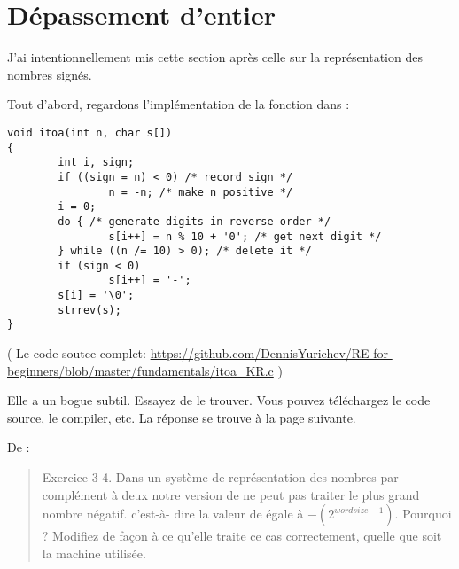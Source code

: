 \section{Dépassement d'entier}

J'ai intentionnellement mis cette section après celle sur la représentation des nombres
signés.

Tout d'abord, regardons l'implémentation de la fonction   dans \InSqBrackets{\KRBook}:

\begin{lstlisting}[style=customc]
void itoa(int n, char s[])
{
        int i, sign;
        if ((sign = n) < 0) /* record sign */
                n = -n; /* make n positive */
        i = 0;
        do { /* generate digits in reverse order */
                s[i++] = n % 10 + '0'; /* get next digit */
        } while ((n /= 10) > 0); /* delete it */
        if (sign < 0)
                s[i++] = '-';
        s[i] = '\0';
        strrev(s);
}
\end{lstlisting}

( Le code soutce complet: \url{https://github.com/DennisYurichev/RE-for-beginners/blob/master/fundamentals/itoa_KR.c} )

Elle a un bogue subtil. Essayez de le trouver. Vous pouvez téléchargez le code source,
le compiler, etc.
La réponse se trouve à la page suivante.

\clearpage

De \InSqBrackets{\KRBook}:

\begin{framed}
\begin{quotation}
Exercice 3-4. Dans un système de représentation des nombres par complément à deux
notre version de  ne peut pas traiter le plus grand nombre négatif. c'est-à-
dire la valeur de  égale à $-(2^{wordsize-1})$. Pourquoi ? Modifiez 
de façon à ce qu'elle traite ce cas correctement, quelle que soit la machine utilisée.
\end{quotation}
\end{framed}

